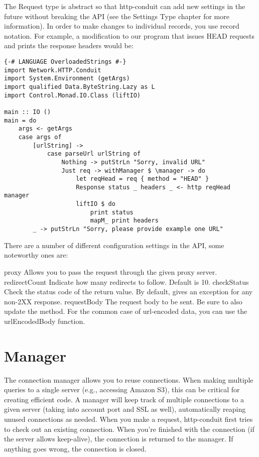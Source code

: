 The Request type is abstract so that http-conduit can add new settings
in the future without breaking the API (see the Settings Type chapter
for more information). In order to make changes to individual records,
you use record notation. For example, a modification to our program
that issues HEAD requests and prints the response headers would be:
\begin{lstlisting}
{-# LANGUAGE OverloadedStrings #-}
import Network.HTTP.Conduit
import System.Environment (getArgs)
import qualified Data.ByteString.Lazy as L
import Control.Monad.IO.Class (liftIO)

main :: IO ()
main = do
    args <- getArgs
    case args of
        [urlString] ->
            case parseUrl urlString of
                Nothing -> putStrLn "Sorry, invalid URL"
                Just req -> withManager $ \manager -> do
                    let reqHead = req { method = "HEAD" }
                    Response status _ headers _ <- http reqHead manager
                    liftIO $ do
                        print status
                        mapM_ print headers
        _ -> putStrLn "Sorry, please provide example one URL"
\end{lstlisting} %

There are a number of different configuration settings in the API,
some noteworthy ones are:

    proxy
      Allows you to pass the request through the given proxy server.
    redirectCount
      Indicate how many redirects to follow. Default is 10.
    checkStatus
      Check the status code of the return value. By default, gives an
      exception for any non-2XX response.
    requestBody
      The request body to be sent. Be sure to also update the method. For the
      common case of url-encoded data, you can use the urlEncodedBody function.

\section{Manager}

The connection manager allows you to reuse connections. When making
multiple queries to a single server (e.g., accessing Amazon S3), this
can be critical for creating efficient code. A manager will keep track
of multiple connections to a given server (taking into account port
and SSL as well), automatically reaping unused connections as
needed. When you make a request, http-conduit first tries to check out
an existing connection. When you're finished with the connection (if
the server allows keep-alive), the connection is returned to the
manager. If anything goes wrong, the connection is closed.

